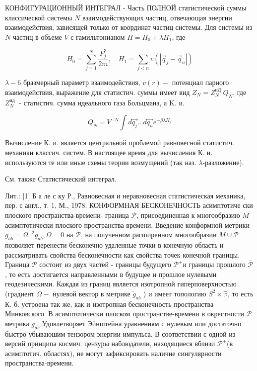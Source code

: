 \documentclass[10pt]{article}
\begin{document}
КОНФИГУРАЦИОННЫЙ ИНТЕГРАЛ - Часть ПОЛНОЙ статистической суммы классической системы $N$ взаимодействующих частиц, отвечающая энергии взаимодействия, зависящей только от координат частиц системы. Для системы из $N$ частиц в объеме $V$ с гамильтонианом $H=H_{0}+\lambda H_{1}$, где



\[

H_{0}=\sum_{j=1}^{N} \frac{P_{j}^{2}}{2 m}, \quad H_{1}=\sum_{j<n} v\left(\left|\vec{q}_{j}-\vec{q}_{n}\right|\right)

\]



$\lambda-6$ бразмерный параметр взаимодействия, $v(r)-$ потенциал парного взаимодействия, выражение для статистич. суммы имеет вид $Z_{N}=Z_{N}^{\text {иД }} Q_{N}$, где $Z_{N}^{\text {ид }}$ - статистич. сумма идеального газа Больцмана, а K. и.



\[

Q_{N}=V^{-N} \int d \overrightarrow{q_{j}} \ldots d \overrightarrow{q_{n}} e^{-\beta \lambda H_{1}}

\]



Вычисление К. и. является центральной проблемой равновесной статистич. механики классич. систем. В настоящее время для вычисления К. и. используются те или иные схемы теории возмущений (так наз. $\lambda$-разложение).



См. также Статистический интеграл.



Лит.: [1] Б а ле с ку Р., Равновесная и неравновесная статистическая механика, пер. с англ., т. 1, М., 1978. КОНФОРМНАЯ БЕСКОНЕЧНОСТЬ асимптотиче ски плоского пространства-времени- граница $\mathscr{P}$, присоединенная к многообразию $M$ асимптотически плоского пространства-времени. Введение конформной метрики $\widetilde{g}_{a b}=\Omega^{-2} g_{a b}, \Omega=0$ на $\mathscr{P}$, на полученном расширенном многообразии $M \cup \mathscr{P}$ позволяет перенести бесконечно удаленные точки в конечную область и рассматривать свойства бесконечности как свойства точек конечной границы. Граница $\mathscr{P}$ состоит из двух частей - границы будущего $\mathscr{P}^{+}$и границы прошлого $\overline{\mathcal{P}}$, то есть достигается направленными в будущее и прошлое нулевыми геодезическими. Каждая из границ является изотропной гиперповерхностью (градиент $\Omega-$ нулевой вектор в метрике $\widetilde{g}_{a b}$ ) и имеет топологию $S^{2} \times \mathbb{R}$, то есть К. б. устроена так же, как и изотропная бесконечность пространства Минковского. В асимптотически плоском пространстве-времени в окрестности $\mathscr{P}$ метрика $g_{a b}$ Удовлетворяет Эйнштейна уравнениям с нулевым или достаточно быстро убываюшим тензором энергии-импульса. В соответствии с одной из версий принципа космич. цензуры наблюдатели, находящиеся вблизи $\mathscr{P}^{+}$(в асимптотич. областях), не могут зафиксировать наличие сингулярности пространства-времени.
\end{document}
